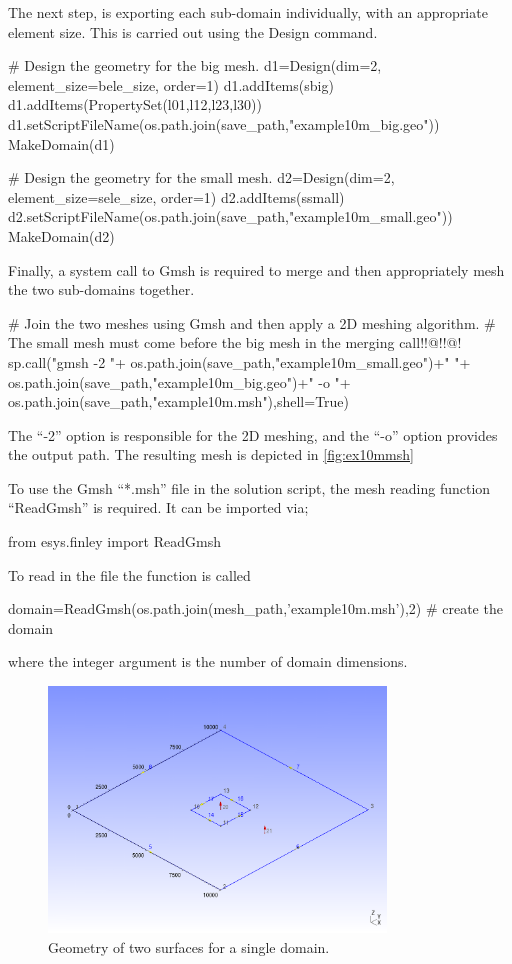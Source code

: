 The next step, is exporting each sub-domain individually, with an appropriate
element size. This is carried out using the \pycad Design command.
\begin{python}
# Design the geometry for the big mesh.
d1=Design(dim=2, element_size=bele_size, order=1)
d1.addItems(sbig)
d1.addItems(PropertySet(l01,l12,l23,l30))
d1.setScriptFileName(os.path.join(save_path,"example10m_big.geo"))
MakeDomain(d1)

# Design the geometry for the small mesh.
d2=Design(dim=2, element_size=sele_size, order=1)
d2.addItems(ssmall)
d2.setScriptFileName(os.path.join(save_path,"example10m_small.geo"))
MakeDomain(d2)
\end{python}
Finally, a system call to Gmsh is required to merge and then appropriately
mesh the two sub-domains together.
\begin{python}
# Join the two meshes using Gmsh and then apply a 2D meshing algorithm.
# The small mesh must come before the big mesh in the merging call!!@!!@!
sp.call("gmsh -2 "+
        os.path.join(save_path,"example10m_small.geo")+" "+
        os.path.join(save_path,"example10m_big.geo")+" -o "+
        os.path.join(save_path,"example10m.msh"),shell=True)
\end{python}
The ``-2'' option is responsible for the 2D meshing, and the ``-o'' option
provides the output path. The resulting mesh is depicted in
\autoref{fig:ex10mmsh}

To use the Gmsh ``*.msh'' file in the solution script, the mesh reading function
``ReadGmsh'' is required. It can be imported via;
\begin{python}
from esys.finley import ReadGmsh
\end{python}
To read in the file the function is called 
\begin{python}
domain=ReadGmsh(os.path.join(mesh_path,'example10m.msh'),2) # create the domain
\end{python}
where the integer argument is the number of domain dimensions.
% 
 \begin{figure}[ht]
\centering
\includegraphics[width=0.8\textwidth]{figures/ex10m_geo.png}
\caption{Geometry of two surfaces for a single domain.}
\label{fig:ex10mgeo}
\end{figure}

